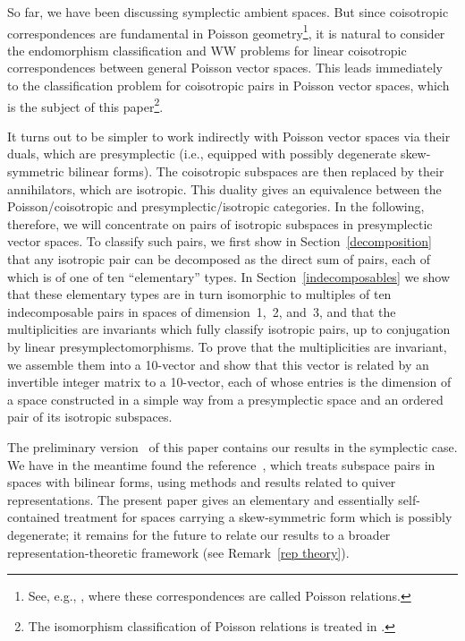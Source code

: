 \documentclass[10pt,a4paper]{amsart}
\numberwithin{equation}{section}
\begin{document}
So far, we have been discussing symplectic ambient spaces. But since co\-isotropic correspondences are fundamental in Poisson geometry\footnote{See, e.g., \cite{we:coisotropic}, where these correspondences are called Poisson relations.},
it is natural to consider the endomorphism classif\/ication and WW problems for linear coisotropic correspondences between general Poisson vector spaces.   This leads immediately to the classif\/ication problem for coisotropic pairs in Poisson vector spaces, which is the subject of this paper\footnote{The isomorphism classif\/ication of Poisson relations is treated in
\cite{lo-we:decomposition}.}.


It turns out to be simpler to work indirectly with Poisson vector spaces  via their duals, which are presymplectic (i.e., equipped with   possibly degenerate skew-symmetric bilinear forms).  The coisotropic subspaces are then replaced by their annihilators, which are isotropic.   This duality gives an equivalence between the Poisson/coisotropic and presymplectic/isotropic categories. In the following, therefore, we will concentrate on pairs of isotropic subspaces in presymplectic vector spaces. To classify such pairs, we f\/irst show in Section~\ref{decomposition}  that any isotropic pair can be decomposed as the direct sum of pairs, each of which is of one of ten ``elementary'' types.  In Section~\ref{indecomposables} we show that these elementary types are in turn isomorphic to multiples of ten indecomposable pairs
in spaces of dimension~1,~2, and~3, and that the multiplicities are invariants which fully classify isotropic pairs, up to conjugation by linear presymplectomorphisms. To prove that the multiplicities are invariant, we assemble them into a 10-vector and show that this vector is related by an invertible integer matrix to a 10-vector, each of whose entries is the dimension of  a space constructed in a simple way from a presymplectic space and an ordered pair of its isotropic subspaces.

The preliminary version~\cite{Lorand_Weinstein} of this paper contains our results in the symplectic case. We have in the meantime found the reference~\cite{Sergeichuk}, which treats subspace pairs in spaces with bilinear forms, using methods and results related to quiver representations. The present paper gives an elementary and essentially self-contained treatment  for spaces carrying a skew-symmetric form which is possibly degenerate; it remains for the future to relate our results to a broader representation-theoretic framework (see Remark~\ref{rep theory}).
\end{document}

